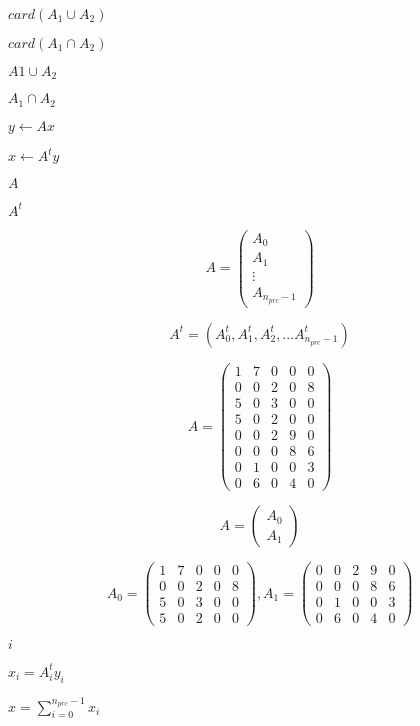 \documentclass{article}
\begin{document}
$ card(A_1 \cup A_2) $
\pagebreak

$ card(A_1 \cap A_2) $
\pagebreak

$ A1 \cup A_2 $
\pagebreak

$ A_1 \cap A_2 $
\pagebreak

$y \leftarrow A x$
\pagebreak

$x \leftarrow A^t y$
\pagebreak

$A$
\pagebreak

$A^t$
\pagebreak

\[ A = \left( \begin{array}{c}A_0 \\A_1\\ \vdots \\ A_{n_{prc}-1} \end{array} \right) \]
\pagebreak

\[ A^t=(A_0^t, A_1^t, A_2^t, ... A_{n_{prc}-1}^t) \]
\pagebreak

\[ A = \left( \begin{array}{ccccc}1&7&0&0&0\\0&0&2&0&8\\5&0&3&0&0\\5&0&2&0&0\\0&0&2&9&0\\0&0&0&8&6\\0&1&0&0&3\\0&6&0&4&0\end{array} \right) \]
\pagebreak

\[ A = \left( \begin{array}{c} A_0 \\ A_1 \end{array} \right) \]
\pagebreak

\[ A_0 = \left( \begin{array}{ccccc} 1&7&0&0&0\\0&0&2&0&8\\5&0&3&0&0\\5&0&2&0&0\end{array} \right) , A_1 = \left( \begin{array}{ccccc} 0&0&2&9&0\\0&0&0&8&6\\0&1&0&0&3\\0&6&0&4&0\end{array} \right) \]
\pagebreak

$ i $
\pagebreak

$ x_i=A_i^t y_i$
\pagebreak

$ x = \sum_{i=0}^{n_{prc}-1} x_i $
\pagebreak
\end{document}
